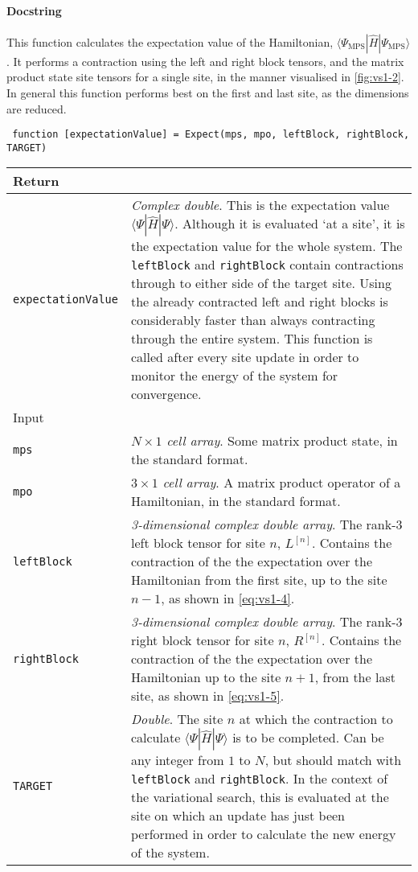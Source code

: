  \paragraph{Docstring} This function calculates the expectation value of the Hamiltonian, \(\langle \Psi_{\mathrm{MPS}} | \hat{H} | \Psi_{\mathrm{MPS}} \rangle\). It performs a contraction using the left and right block tensors, and the matrix product state site tensors for a single site, in the manner visualised in \cref{fig:vs1-2}. In general this function performs best on the first and last site, as the dimensions are reduced.
 \begin{lstlisting}
 function [expectationValue] = Expect(mps, mpo, leftBlock, rightBlock, TARGET) \end{lstlisting}
 \begin{longtabu}{X[1,l]X[3,l]}
 \hline
 Return & \\ \hline
 \lstinline$expectationValue$ & \emph{Complex double}. This is the expectation value \(\langle \Psi | \hat{H} | \Psi \rangle\). Although it is evaluated `at a site', it is the expectation value for the whole system. The \lstinline$leftBlock$ and \lstinline$rightBlock$ contain contractions through to either side of the target site. Using the already contracted left and right blocks is considerably faster than always contracting through the entire system. This function is called after every site update in order to monitor the energy of the system for convergence.  \\ \hline
 Input & \\ \hline
 \lstinline$mps$ & \emph{\(N \times 1\) cell array}. Some matrix product state, in the standard format. \\
 \lstinline$mpo$ & \emph{\(3 \times 1\) cell array}. A matrix product operator of a Hamiltonian, in the standard format.\\
 \lstinline$leftBlock$ & \emph{3-dimensional complex double array}. The rank-3 left block tensor for site \(n\), \(L^{[n]}\). Contains the contraction of the the expectation over the Hamiltonian from the first site, up to the site \(n-1\), as shown in \cref{eq:vs1-4}.\\
 \lstinline$rightBlock$ & \emph{3-dimensional complex double array}. The rank-3 right block tensor for site \(n\), \(R^{[n]}\). Contains the contraction of the the expectation over the Hamiltonian up to the site \(n+1\), from the last site, as shown in \cref{eq:vs1-5}. \\
 \lstinline$TARGET$ & \emph{Double}. The site \(n\) at which the contraction to calculate \(\langle \Psi | \hat{H} | \Psi \rangle\) is to be completed. Can be any integer from \(1\) to \(N\), but should match with \lstinline$leftBlock$ and \lstinline$rightBlock$. In the context of the variational search, this is evaluated at the site on which an update has just been performed in order to calculate the new energy of the system. \\
 \hline
 \end{longtabu}
